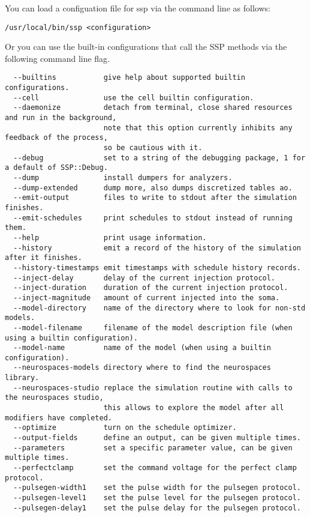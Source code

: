 \documentclass[12pt]{article}
\begin{document}
You can load a configuation file for ssp via the command line as follows:

\begin{verbatim}
/usr/local/bin/ssp <configuration>
\end{verbatim}

Or you can use the built-in configurations that call the SSP methods via the following command line flag.

\begin{verbatim}
  --builtins           give help about supported builtin configurations.
  --cell               use the cell builtin configuration.
  --daemonize          detach from terminal, close shared resources and run in the background,
                       note that this option currently inhibits any feedback of the process,
                       so be cautious with it.
  --debug              set to a string of the debugging package, 1 for a default of SSP::Debug.
  --dump               install dumpers for analyzers.
  --dump-extended      dump more, also dumps discretized tables ao.
  --emit-output        files to write to stdout after the simulation finishes.
  --emit-schedules     print schedules to stdout instead of running them.
  --help               print usage information.
  --history            emit a record of the history of the simulation after it finishes.
  --history-timestamps emit timestamps with schedule history records.
  --inject-delay       delay of the current injection protocol.
  --inject-duration    duration of the current injection protocol.
  --inject-magnitude   amount of current injected into the soma.
  --model-directory    name of the directory where to look for non-std models.
  --model-filename     filename of the model description file (when using a builtin configuration).
  --model-name         name of the model (when using a builtin configuration).
  --neurospaces-models directory where to find the neurospaces library.
  --neurospaces-studio replace the simulation routine with calls to the neurospaces studio,
                       this allows to explore the model after all modifiers have completed.
  --optimize           turn on the schedule optimizer.
  --output-fields      define an output, can be given multiple times.
  --parameters         set a specific parameter value, can be given multiple times.
  --perfectclamp       set the command voltage for the perfect clamp protocol.
  --pulsegen-width1    set the pulse width for the pulsegen protocol.
  --pulsegen-level1    set the pulse level for the pulsegen protocol.
  --pulsegen-delay1    set the pulse delay for the pulsegen protocol.

\end{verbatim}
\end{document}

